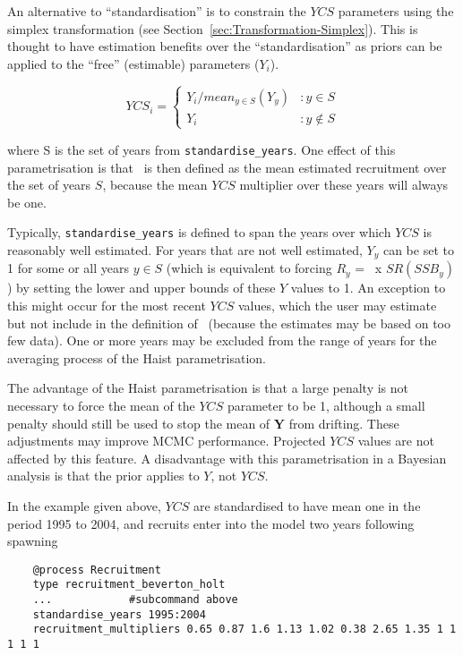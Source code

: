 An alternative to \enquote{standardisation} is to constrain the $YCS$ parameters using the simplex transformation (see Section~\ref{sec:Transformation-Simplex}). This is thought to have estimation benefits over the \enquote{standardisation} as priors can be applied to the \enquote{free} (estimable) parameters (\(Y_i\)).

\[
YCS_i =
\begin{cases}
Y_i / mean_{y \in S}(Y_y) & :y \in S\\
Y_i					 & :y \notin S
\end{cases}
\]

where S is the set of years from \texttt{standardise\_years}. One effect of this parametrisation is that \Rzero\ is then defined as the mean estimated recruitment over the set of years $S$, because the mean $YCS$ multiplier over these years will always be one.

Typically, \texttt{standardise\_years} is defined to span the years over which $YCS$ is reasonably well estimated. For years that are not well estimated, $Y_y$ can be set to 1 for some or all years $y\in S$ (which is equivalent to forcing $R_y$ = \Rzero\ x $SR(SSB_y)$) by setting the lower and upper bounds of these $Y$ values to 1. An exception to this might occur for the most recent $YCS$ values, which the user may estimate but not include in the definition of \Rzero\ (because the estimates may be based on too few data). One or more years may be excluded from the range of years for the averaging process of the Haist parametrisation.

The advantage of the Haist parametrisation is that a large penalty is not necessary to force the mean of the $YCS$ parameter to be 1, although a small penalty should still be used to stop the mean of \textbf{Y} from drifting. These adjustments may improve MCMC performance. Projected $YCS$ values are not affected by this feature. A disadvantage with this parametrisation in a Bayesian analysis is that the prior applies to $Y$, not $YCS$.

In the  example given above, $YCS$ are standardised to have mean one in the period 1995 to 2004, and recruits enter into the model two years following spawning

{\small{\begin{verbatim}
	@process Recruitment
	type recruitment_beverton_holt
	...            #subcommand above
	standardise_years 1995:2004
	recruitment_multipliers 0.65 0.87 1.6 1.13 1.02 0.38 2.65 1.35 1 1 1 1 1
\end{verbatim}}}

